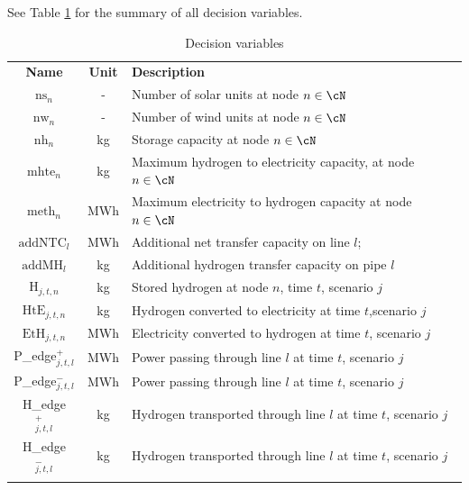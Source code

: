 See Table \ref{table_vars} for the summary of all decision variables.


\begin{table}
  \caption{Decision variables}
  \label{table_vars}       %
  \begin{tabularx}{\textwidth}{ccl}
  \hline\noalign{\smallskip}
  \textbf{Name} & \textbf{Unit} & \textbf{Description}  \\
  \noalign{\smallskip}\hline\noalign{\smallskip}
  $\text{ns}_n$ & - & Number of solar units at node $n \in \cN$ \\
  $\text{nw}_n$ & - & Number of wind units at node $n \in \cN$ \\
  $\text{nh}_n$ & kg & Storage capacity at node $n \in \cN$\\
  $\text{mhte}_n$ & kg & \parbox[t]{0.70\textwidth}{Maximum hydrogen to electricity capacity,  at node $n \in \cN$} \\
  $\text{meth}_n$ & MWh & Maximum electricity to hydrogen capacity at node $n \in \cN$\\
  $\text{addNTC}_l$ & MWh & Additional net transfer capacity on line $l$;\\
  $\text{addMH}_l$ & kg & Additional hydrogen transfer capacity on pipe $l$\\
  \noalign{\smallskip}\hline\noalign{\smallskip}
  $\text{H}_{j,t,n}$ & kg& Stored hydrogen at node $n$, time \(t\), scenario \(j\)\\
  $\text{HtE}_{j,t,n}$ & kg& Hydrogen converted to electricity at time \(t\),scenario \(j\) \\
  $\text{EtH}_{j,t,n}$ & MWh& Electricity converted to hydrogen at time \(t\), scenario \(j\)\\
  P\_edge$^+_{j,t,l}$&MWh& Power passing through line $l$ at time $t$, scenario $j$ \\
  P\_edge$^-_{j,t,l}$&MWh& Power passing through line $l$ at time $t$, scenario $j$ \\
  H\_edge$^+_{j,t,l}$&kg& Hydrogen transported through line $l$ at time $t$, scenario $j$\\
  H\_edge$^-_{j,t,l}$&kg& Hydrogen transported through line $l$ at time $t$, scenario $j$\\
  \noalign{\smallskip}\hline
  \end{tabularx}
  \end{table}
  


